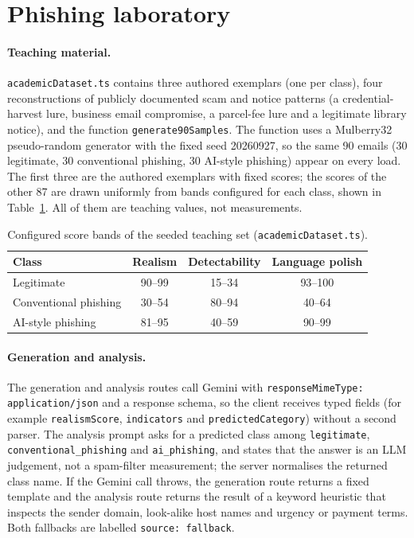 \section{Phishing laboratory}
\label{sec:impl-phish}

\paragraph{Teaching material.} \texttt{academicDataset.ts} contains three authored exemplars (one per class), four reconstructions of publicly documented scam and notice patterns (a credential-harvest lure, business email compromise, a parcel-fee lure and a legitimate library notice), and the function \texttt{generate90Samples}. The function uses a Mulberry32 pseudo-random generator with the fixed seed 20260927, so the same 90 emails (30 legitimate, 30 conventional phishing, 30 AI-style phishing) appear on every load. The first three are the authored exemplars with fixed scores; the scores of the other 87 are drawn uniformly from bands configured for each class, shown in Table~\ref{tab:bands}. All of them are teaching values, not measurements.

\begin{table}[htbp]
\centering
\caption{Configured score bands of the seeded teaching set (\texttt{academicDataset.ts}).}
\label{tab:bands}
\scriptsize
\begin{tabular}{lccc}
\toprule
Class & Realism & Detectability & Language polish \\
\midrule
Legitimate & 90--99 & 15--34 & 93--100 \\
Conventional phishing & 30--54 & 80--94 & 40--64 \\
AI-style phishing & 81--95 & 40--59 & 90--99 \\
\bottomrule
\end{tabular}
\end{table}

\paragraph{Generation and analysis.} The generation and analysis routes call Gemini with \texttt{responseMimeType: application/json} and a response schema, so the client receives typed fields (for example \texttt{realismScore}, \texttt{indicators} and \texttt{predictedCategory}) without a second parser. The analysis prompt asks for a predicted class among \texttt{legitimate}, \texttt{conventional\_phishing} and \texttt{ai\_phishing}, and states that the answer is an LLM judgement, not a spam-filter measurement; the server normalises the returned class name. If the Gemini call throws, the generation route returns a fixed template and the analysis route returns the result of a keyword heuristic that inspects the sender domain, look-alike host names and urgency or payment terms. Both fallbacks are labelled \texttt{source: fallback}.

